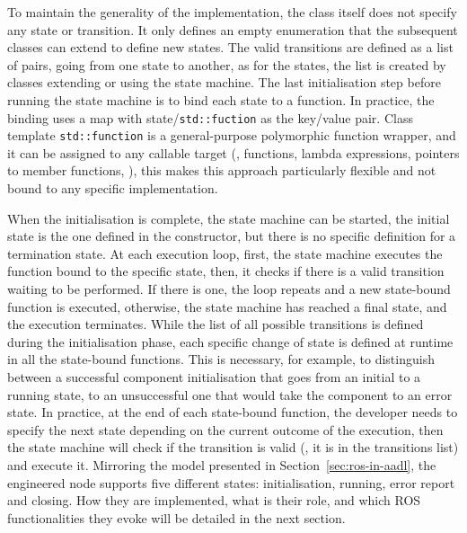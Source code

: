To maintain the generality of the implementation, the class itself does not specify any state or transition. It only defines an empty enumeration that the subsequent classes can extend to define new states. The valid transitions are defined as a list of pairs, going from one state to another, as for the states, the list is created by classes extending or using the state machine. The last initialisation step before running the state machine is to bind each state to a function. In practice, the binding uses a map with state/\texttt{std::fuction} as the key/value pair. Class template \texttt{std::function} is a general-purpose polymorphic function wrapper, and it can be assigned to any callable target (\eg, functions, lambda expressions, pointers to member functions, \etc), this makes this approach particularly flexible and not bound to any specific implementation. 

When the initialisation is complete, the state machine can be started, the initial state is the one defined in the constructor, but there is no specific definition for a termination state. At each execution loop, first, the state machine executes the function bound to the specific state, then, it checks if there is a valid transition waiting to be performed. If there is one, the loop repeats and a new state-bound function is executed, otherwise, the state machine has reached a final state, and the execution terminates. While the list of all possible transitions is defined during the initialisation phase, each specific change of state is defined at runtime in all the state-bound functions. This is necessary, for example, to distinguish between a successful component initialisation that goes from an initial to a running state, to an unsuccessful one that would take the component to an error state. In practice, at the end of each state-bound function, the developer needs to specify the next state depending on the current outcome of the execution, then the state machine will check if the transition is valid (\ie, it is in the transitions list) and execute it. Mirroring the model presented in Section~\ref{sec:ros-in-aadl}, the engineered node supports five different states: initialisation, running, error report and closing. How they are implemented, what is their role, and which ROS functionalities they evoke will be detailed in the next section.

